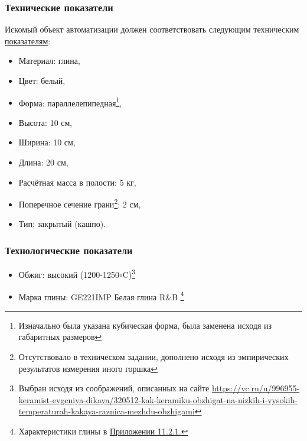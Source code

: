 \documentclass[16pt,a4paper]{article}
\begin{document}
\subsubsection{Технические показатели}
Искомый объект автоматизации должен соответствовать следующим техническим \hyperref[sec:1.6.1.]{показателям}:
\begin{itemize}
    \item Материал: глина,
    \item Цвет: белый,
    \item Форма: параллелепипедная\footnote{Изначально была указана кубическая форма, была заменена исходя из габаритных размеров},
    \item Высота: 10 см,
    \item Ширина: 10 см,
    \item Длина: 20 см,
    \item Расчётная масса в полости: 5 кг,
    \item Поперечное сечение грани\footnote{Отсутствовало в техническом задании, дополнено исходя из эмпирических результатов измерения иного горшка}: 2 см,
    \item Тип: закрытый (кашпо).
\end{itemize}
\subsubsection{Технологические показатели}
\begin{itemize}
    \item Обжиг: высокий (1200-1250${\circ}$C)\footnote{Выбран исходя из соображений, описанных на сайте \url{https://vc.ru/u/996955-keramist-evgeniya-dikaya/320512-kak-keramiku-obzhigat-na-nizkih-i-vysokih-temperaturah-kakaya-raznica-mezhdu-obzhigami}}
    \item Марка глины: GE221IMP Белая глина R\&B \footnote{Характеристики глины в \hyperref[sec:at1]{Приложении 11.2.1.}}
\end{itemize}
\end{document}

